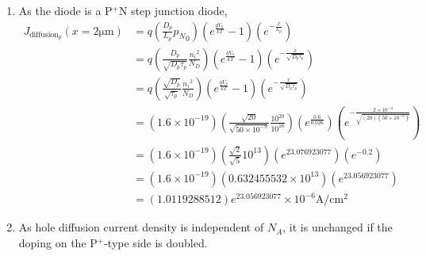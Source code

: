 \documentclass[fleqn, a4paper, 10pt, oneside]{amsart}
\theoremstyle{definition}
\theoremstyle{theorem}
\begin{document}
\begin{solution}
	\begin{enumerate}[leftmargin=*]
		\item
			As the diode is a P$^+$N step junction diode,
			\begin{align*}
				J_{\text{diffusion}_p}(x = 2 \si{\micro\metre}) & = q \left( \frac{D_p}{L_p} {p_N}_0 \right) \left( e^{\frac{q V_a}{k T}} - 1 \right) \left( e^{-\frac{x}{L_p}} \right)                                                                                                                                 \\
                                                                                & = q \left( \frac{D_p}{\sqrt{D_p \tau_p}} \frac{{n_i}^2}{N_D} \right) \left( e^{\frac{q V_a}{k T}} - 1 \right) \left( e^{-\frac{x}{\sqrt{D_p \tau_p}}} \right)                                                                                         \\
                                                                                & = q \left( \frac{\sqrt{D_p}}{\sqrt{\tau_p}} \frac{{n_i}^2}{N_D} \right) \left( e^{\frac{q V_a}{k T}} - 1 \right) \left( e^{-\frac{x}{\sqrt{D_p \tau_p}}} \right)                                                                                      \\
                                                                                & = \left( 1.6 \times 10^{-19} \right) \left( \frac{\sqrt{20}}{\sqrt{50 \times 10^{-9}}} \frac{10^{20}}{10^{16}} \right) \left( e^{\frac{0.6}{0.026}} \right) \left( e^{-\frac{2 \times 10^{-4}}{\sqrt{(20) \left( 50 \times 10^{-9} \right)}}} \right) \\
                                                                                & = \left( 1.6 \times 10^{-19} \right) \left( \frac{\sqrt{2}}{\sqrt{5}} 10^{13} \right) \left( e^{23.076923077} \right) \left( e^{-0.2} \right)                                                                                                         \\
                                                                                & = \left( 1.6 \times 10^{-19} \right) \left( 0.632455532 \times 10^{13} \right) \left( e^{23.056923077} \right)                                                                                                                                        \\
                                                                                & = (1.0119288512) e^{23.056923077} \times 10^{-6} \si{\ampere\per\centi\metre\squared}
			\end{align*}
		\item
			As hole diffusion current density is independent of $N_A$, it is unchanged if the doping on the P$^+$-type side is doubled.
	\end{enumerate}
\end{solution}
\end{document}
